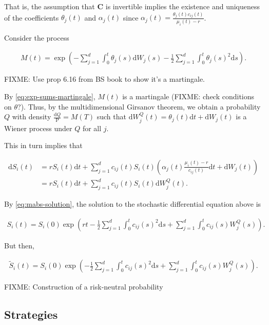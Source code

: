 \documentclass[a4paper]{article}
\begin{document}
That is, the assumption that $\mathbf{C}$ is invertible implies the existence and uniqueness of the coefficients $\theta_j(t)$ and $\alpha_j(t)$ since $\alpha_j(t) = \frac{\theta_j(t) c_{ij}(t)}{\mu_i(t) - r}$.

Consider the process

\begin{align*}
  M(t) = \exp \left( - \sum_{j=1}^{d} \int_0^t \theta_j(s) \mathrm{d}W_j(s) - \frac{1}{2} \sum_{j=1}^{d} \int_0^t \theta_j(s)^2 \mathrm{d}s \right).
\end{align*}

FIXME: Use prop 6.16 from BS book to show it's a martingale.

By \eqref{eq:exp-sums-martingale}, $M(t)$ is a martingale (FIXME: check conditions on $\theta$?). Thus, by the multidimensional Girsanov theorem, we obtain a probability $Q$ with density $\frac{\mathrm{d}Q}{\mathrm{P}} = M(T)$ such that $\mathrm{d}W^Q_j(t) = \theta_j(t) \mathrm{d}t + \mathrm{d}W_j(t)$ is a Wiener process under $Q$ for all $j$.

This in turn implies that

\begin{align*}
  \mathrm{d}S_i(t)
  &= r S_i(t) \mathrm{d}t + \sum_{j=1}^{d} c_{ij}(t) S_i(t) \left(\alpha_j(t) \frac{\mu_i(t) - r}{c_{ij}(t)} \mathrm{d}t + \mathrm{d}W_j(t)\right)\\
  &= r S_i(t) \mathrm{d}t + \sum_{j=1}^{d} c_{ij}(t) S_i(t) \mathrm{d}W^Q_j(t).
\end{align*}

By \eqref{eq:mabs-solution}, the solution to the stochastic differential equation above is

\begin{align*}
  S_i(t)
  = S_i(0) \exp \left( r t - \frac{1}{2} \sum_{j=1}^{d} \int_0^t c_{ij}(s)^2 \mathrm{d}s + \sum_{j=1}^{d} \int_0^t c_{ij}(s) W^Q_j(s) \right).
\end{align*}

But then,

\begin{align*}
  \tilde{S}_i(t)
  = S_i(0) \exp \left( - \frac{1}{2} \sum_{j=1}^{d} \int_0^t c_{ij}(s)^2 \mathrm{d}s + \sum_{j=1}^{d} \int_0^t c_{ij}(s) W^Q_j(s) \right).
\end{align*}

FIXME: Construction of a risk-neutral probability

\subsection{Strategies}
\end{document}
